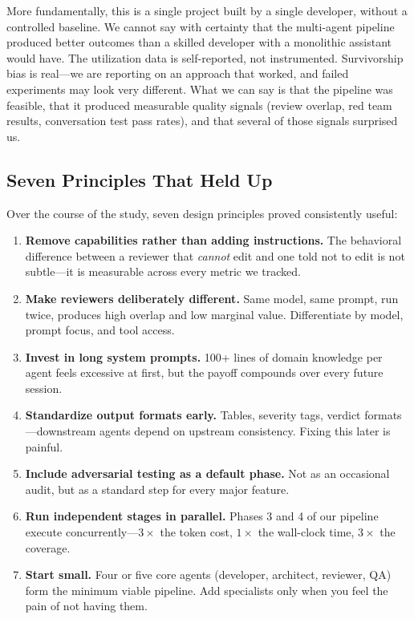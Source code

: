 \documentclass[11pt,a4paper]{article}
\begin{document}
More fundamentally, this is a single project built by a single developer, without a controlled baseline. We cannot say with certainty that the multi-agent pipeline produced better outcomes than a skilled developer with a monolithic assistant would have. The utilization data is self-reported, not instrumented. Survivorship bias is real---we are reporting on an approach that worked, and failed experiments may look very different. What we can say is that the pipeline was feasible, that it produced measurable quality signals (review overlap, red team results, conversation test pass rates), and that several of those signals surprised us.

\subsection{Seven Principles That Held Up}

Over the course of the study, seven design principles proved consistently useful:

\begin{enumerate}
    \item \textbf{Remove capabilities rather than adding instructions.} The behavioral difference between a reviewer that \textit{cannot} edit and one told not to edit is not subtle---it is measurable across every metric we tracked.
    \item \textbf{Make reviewers deliberately different.} Same model, same prompt, run twice, produces high overlap and low marginal value. Differentiate by model, prompt focus, and tool access.
    \item \textbf{Invest in long system prompts.} 100+ lines of domain knowledge per agent feels excessive at first, but the payoff compounds over every future session.
    \item \textbf{Standardize output formats early.} Tables, severity tags, verdict formats---downstream agents depend on upstream consistency. Fixing this later is painful.
    \item \textbf{Include adversarial testing as a default phase.} Not as an occasional audit, but as a standard step for every major feature.
    \item \textbf{Run independent stages in parallel.} Phases 3 and 4 of our pipeline execute concurrently---$3\times$ the token cost, $1\times$ the wall-clock time, $3\times$ the coverage.
    \item \textbf{Start small.} Four or five core agents (developer, architect, reviewer, QA) form the minimum viable pipeline. Add specialists only when you feel the pain of not having them.
\end{enumerate}
\end{document}
